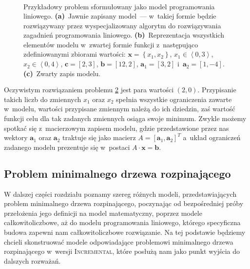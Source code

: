 \begin{figure}[!htbp]
\begin{subfigure}[b]{0.3\textwidth}
\begin{subequations}
\begin{alignat*}{4}
			\end{alignat*}
		\end{subequations}
		\caption{}
		\label{fig:lpexample:c}
	\end{subfigure}
	\hfill\null
	\caption{
		Przykładowy problem sformułowany jako model programowania liniowego.
		\textbf{(a)}~Jawnie zapisany model~--- w~takiej formie będzie rozwiązywany przez wyspecjalizowany algorytm do rozwiązywania zagadnień programowania liniowego.
		\textbf{(b)}~Reprezentacja wszystkich elementów modelu w~zwartej formie funkcji z~następująco zdefiniowanymi zbiorami wartości: $\textbf{x} = \left\{ x_{1}, x_{2} \right\}$, $x_{1} \in \left\langle 0, 3 \right\rangle$, $x_{2} \in \left\langle 0, 4 \right\rangle$, $\textbf{c} = \left[ 2, 3 \right]$, $\textbf{b} = \left[ 12, 2 \right]$, $\textbf{a}_{1} = \left[ 3, 2 \right]$ i~$\textbf{a}_{2} = \left[ 1, -4 \right]$.
		\textbf{(c)}~Zwarty zapis modelu.
	}
	\label{fig:lpexample}
\end{figure}

Oczywistym rozwiązaniem problemu \ref{fig:lpexample} jest para wartości $\left( 2, 0 \right)$.
Przypisanie takich liczb do zmiennych $x_{1}$ oraz $x_{2}$ spełnia wszystkie ograniczenia zawarte w~modelu, wartości przypisane zmiennym należą do ich dziedzin, zaś wartość funkcji celu dla tak zadanych zmiennych osiąga swoje minimum.
Zwykle możemy spotkać się z~macierzowym zapisem modelu, gdzie przedstawione przez nas wektory $\textbf{a}_{1}$ oraz $\textbf{a}_{2}$ traktuje się jako macierz $A = \left[ \textbf{a}_{1}, \textbf{a}_{2} \right]^{T}$ a~układ ograniczeń zadanego modelu prezentuje się w~postaci $A \cdot \textbf{x} = \textbf{b}$.



\subsection{Problem minimalnego drzewa rozpinającego}



W dalszej części rozdziału poznamy szereg różnych modeli, przedstawiających problem minimalnego drzewa rozpinającego, poczynając od bezpośredniej próby przełożenia jego definicji na model matematyczny, poprzez modele całkowitoliczbowe, aż do modelu programowania liniowego, którego specyficzna budowa zapewni nam całkowitoliczbowe rozwiązanie.
Na tej podstawie będziemy chcieli skonstruować modele odpowiadające problemowi minimalnego drzewa rozpinającego w~wersji \textsc{Incremental}, które posłużą nam jako punkt wyjścia do dalszych rozważań.



